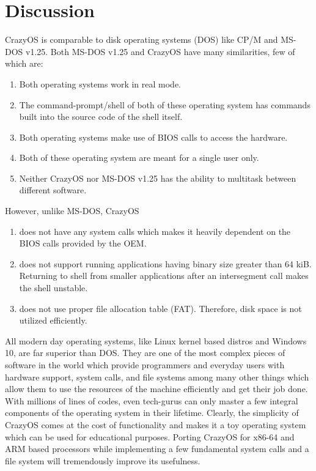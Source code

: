 \section{Discussion}
CrazyOS is comparable to disk operating systems (DOS) like CP/M and MS-DOS v1.25. Both MS-DOS v1.25 and CrazyOS have many similarities, few of which are:
\begin{enumerate}
  \item Both operating systems work in real mode.
  \item The command-prompt/shell of both of these operating system has commands built into the source code of the shell itself.
  \item Both operating systems make use of BIOS calls to access the hardware.
  \item Both of these operating system are meant for a single user only.
  \item Neither CrazyOS nor MS-DOS v1.25 has the ability to multitask between different software. 
\end{enumerate}
However, unlike MS-DOS, CrazyOS
\begin{enumerate}
  \item does not have any system calls which makes it heavily dependent on the BIOS calls provided by the OEM.
  \item does not support running applications having binary size greater than 64 kiB. Returning to shell from smaller applications after an intersegment call makes the shell unstable.
  \item does not use proper file allocation table (FAT). Therefore, disk space is not utilized efficiently.
\end{enumerate}
All modern day operating systems, like Linux kernel based distros and Windows 10, are far superior than DOS. They are one of the most complex pieces of software in the world which provide programmers and everyday users with hardware support, system calls, and file systems among many other things which allow them to use the resources of the machine efficiently and get their job done. With millions of lines of codes, even tech-gurus can only master a few integral components of the operating system in their lifetime. Clearly, the simplicity of CrazyOS comes at the cost of functionality and makes it a toy operating system which can be used for educational purposes. Porting CrazyOS for x86-64 and ARM based processors while implementing a few fundamental system calls and a file system will tremendously improve its usefulness.









